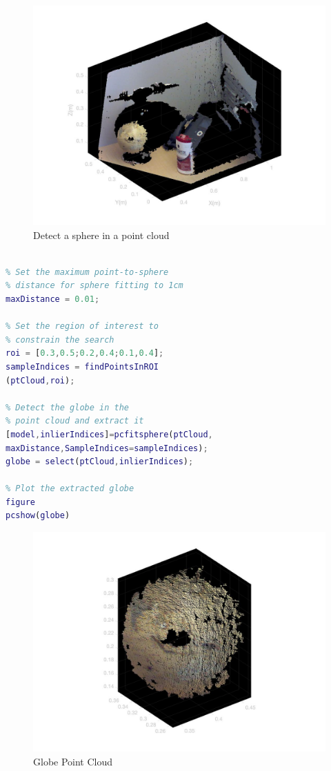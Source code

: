 \documentclass[conference]{IEEEtran}
\begin{document}
\begin{figure}[h!]
\centering
\includegraphics[width=0.8\linewidth]{images/object.jpg}
\caption{Detect a sphere in a point cloud}
\label{fig:object}
\end{figure}

\begin{lstlisting}[language=Matlab]

% Set the maximum point-to-sphere 
% distance for sphere fitting to 1cm
maxDistance = 0.01;

% Set the region of interest to 
% constrain the search
roi = [0.3,0.5;0.2,0.4;0.1,0.4];
sampleIndices = findPointsInROI
(ptCloud,roi);

% Detect the globe in the 
% point cloud and extract it
[model,inlierIndices]=pcfitsphere(ptCloud,
maxDistance,SampleIndices=sampleIndices);
globe = select(ptCloud,inlierIndices);

% Plot the extracted globe
figure
pcshow(globe)

\end{lstlisting}

\begin{figure}[H]
\centering
\includegraphics[width=0.8\linewidth]{images/globe.jpg}
\caption{Globe Point Cloud}
\label{fig:globe}
\end{figure}
\end{document}

